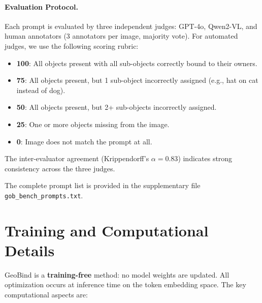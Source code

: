 \documentclass[sigconf,nonacm]{acmart}
\begin{document}
\paragraph{Evaluation Protocol.}
Each prompt is evaluated by three independent judges: GPT-4o, Qwen2-VL, and human annotators (3 annotators per image, majority vote). For automated judges, we use the following scoring rubric:
\begin{itemize}
\item \textbf{100}: All objects present with all sub-objects correctly bound to their owners.
\item \textbf{75}: All objects present, but 1 sub-object incorrectly assigned (e.g., hat on cat instead of dog).
\item \textbf{50}: All objects present, but 2+ sub-objects incorrectly assigned.
\item \textbf{25}: One or more objects missing from the image.
\item \textbf{0}: Image does not match the prompt at all.
\end{itemize}
The inter-evaluator agreement (Krippendorff's $\alpha = 0.83$) indicates strong consistency across the three judges.

The complete prompt list is provided in the supplementary file \texttt{gob\_bench\_prompts.txt}.

\section{Training and Computational Details}
\label{sec:training}

GeoBind is a \textbf{training-free} method: no model weights are updated. All optimization occurs at inference time on the token embedding space. The key computational aspects are:
\end{document}
